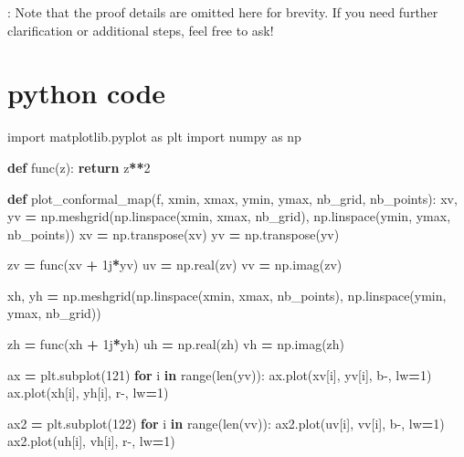 \documentclass[
]{book}
\newenvironment{Shaded}{\begin{snugshade}}{\end{snugshade}}
\newcommand{\BuiltInTok}[1]{#1}
\newcommand{\ControlFlowTok}[1]{\textcolor[rgb]{0.13,0.29,0.53}{\textbf{#1}}}
\newcommand{\DecValTok}[1]{\textcolor[rgb]{0.00,0.00,0.81}{#1}}
\newcommand{\ImportTok}[1]{#1}
\newcommand{\KeywordTok}[1]{\textcolor[rgb]{0.13,0.29,0.53}{\textbf{#1}}}
\newcommand{\NormalTok}[1]{#1}
\newcommand{\OperatorTok}[1]{\textcolor[rgb]{0.81,0.36,0.00}{\textbf{#1}}}
\newcommand{\OtherTok}[1]{\textcolor[rgb]{0.56,0.35,0.01}{#1}}
\newcommand{\StringTok}[1]{\textcolor[rgb]{0.31,0.60,0.02}{#1}}
\theoremstyle{definition}
\theoremstyle{definition}
\theoremstyle{definition}
\theoremstyle{definition}
\theoremstyle{remark}
\begin{document}
: Note that the proof details are omitted here for brevity. If you need further clarification or additional steps, feel free to ask!

\chapter{python code}\label{python-code}

\begin{Shaded}
\begin{Highlighting}[]
\ImportTok{import}\NormalTok{ matplotlib.pyplot }\ImportTok{as}\NormalTok{ plt}
\ImportTok{import}\NormalTok{ numpy }\ImportTok{as}\NormalTok{ np}

\KeywordTok{def}\NormalTok{ func(z):}
    \ControlFlowTok{return}\NormalTok{ z}\OperatorTok{**}\DecValTok{2}


\KeywordTok{def}\NormalTok{ plot\_conformal\_map(f, xmin, xmax, ymin, ymax, nb\_grid, nb\_points):}
\NormalTok{    xv, yv }\OperatorTok{=}\NormalTok{ np.meshgrid(np.linspace(xmin, xmax, nb\_grid), np.linspace(ymin, ymax, nb\_points))}
\NormalTok{    xv }\OperatorTok{=}\NormalTok{ np.transpose(xv)}
\NormalTok{    yv }\OperatorTok{=}\NormalTok{ np.transpose(yv)}

\NormalTok{    zv }\OperatorTok{=}\NormalTok{ func(xv }\OperatorTok{+} \OtherTok{1j}\OperatorTok{*}\NormalTok{yv)}
\NormalTok{    uv }\OperatorTok{=}\NormalTok{ np.real(zv)}
\NormalTok{    vv }\OperatorTok{=}\NormalTok{ np.imag(zv)}

\NormalTok{    xh, yh }\OperatorTok{=}\NormalTok{ np.meshgrid(np.linspace(xmin, xmax, nb\_points), np.linspace(ymin, ymax, nb\_grid))}

\NormalTok{    zh }\OperatorTok{=}\NormalTok{ func(xh }\OperatorTok{+} \OtherTok{1j}\OperatorTok{*}\NormalTok{yh)}
\NormalTok{    uh }\OperatorTok{=}\NormalTok{ np.real(zh)}
\NormalTok{    vh }\OperatorTok{=}\NormalTok{ np.imag(zh)}

\NormalTok{    ax }\OperatorTok{=}\NormalTok{ plt.subplot(}\DecValTok{121}\NormalTok{)}
    \ControlFlowTok{for}\NormalTok{ i }\KeywordTok{in} \BuiltInTok{range}\NormalTok{(}\BuiltInTok{len}\NormalTok{(yv)):}
\NormalTok{        ax.plot(xv[i], yv[i], }\StringTok{\textquotesingle{}b{-}\textquotesingle{}}\NormalTok{, lw}\OperatorTok{=}\DecValTok{1}\NormalTok{)}
\NormalTok{        ax.plot(xh[i], yh[i], }\StringTok{\textquotesingle{}r{-}\textquotesingle{}}\NormalTok{, lw}\OperatorTok{=}\DecValTok{1}\NormalTok{)}

\NormalTok{    ax2 }\OperatorTok{=}\NormalTok{ plt.subplot(}\DecValTok{122}\NormalTok{)}
    \ControlFlowTok{for}\NormalTok{ i }\KeywordTok{in} \BuiltInTok{range}\NormalTok{(}\BuiltInTok{len}\NormalTok{(vv)):}
\NormalTok{        ax2.plot(uv[i], vv[i], }\StringTok{\textquotesingle{}b{-}\textquotesingle{}}\NormalTok{, lw}\OperatorTok{=}\DecValTok{1}\NormalTok{)}
\NormalTok{        ax2.plot(uh[i], vh[i], }\StringTok{\textquotesingle{}r{-}\textquotesingle{}}\NormalTok{, lw}\OperatorTok{=}\DecValTok{1}\NormalTok{)}


\end{Highlighting}
\end{Shaded}
\end{document}
